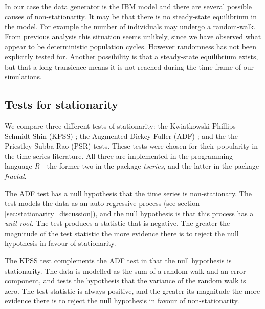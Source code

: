 In our case the data generator is the IBM model and there are several possible causes of non-stationarity. It may be that there is no steady-state equilibrium in the model. For example the number of individuals may undergo a random-walk. From previous analysis this situation seems unlikely, since we have observed what appear to be deterministic population cycles. However randomness has not been explicitly tested for. Another possibility is that a steady-state equilibrium exists, but that a long transience  means it is not reached during the time frame of our simulations.


\subsection{Tests for stationarity}
\label{sec:stat_tests}

We compare three different tests of stationarity: the Kwiatkowski-Phillips-Schmidt-Shin (KPSS) \cite{kwiatkowski1992testing}; the Augmented Dickey-Fuller (ADF) \cite{said1984testing}; and the the Priestley-Subba Rao (PSR) \cite{priestley1969test} tests. These tests were chosen for their popularity in the time series literature. All three are implemented in the programming language \emph{R} \cite{Rlanguage} - the former two in the package \emph{tseries}, and the latter in the package \emph{fractal}.

The ADF test has a null hypothesis that the time series is non-stationary. The test models the data as an auto-regressive process (see section \ref{sec:stationarity_discussion}), and the null hypothesis is that this process has a \emph{unit root}. The test produces a statistic that is negative. The greater the magnitude of the test statistic the more evidence there is to reject the null hypothesis in favour of stationarity.

The KPSS test complements the ADF test in that the null hypothesis is stationarity. The data is modelled as the sum of a random-walk and an error component, and tests the hypothesis that the variance of the random walk is zero. The test statistic is always positive, and the greater its magnitude the more evidence there is to reject the null hypothesis in favour of non-stationarity.

